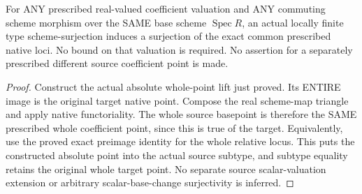 \begin{theorem}
\label{scheme:relative-native-locally-finite-type-surjective}
For ANY prescribed real-valued coefficient valuation and ANY commuting scheme
morphism over the SAME base scheme $\operatorname{Spec}R$, an actual locally finite
type scheme-surjection induces a surjection of the exact common prescribed native
loci. No bound on that valuation is required. No assertion for a separately
prescribed different source coefficient point is made.
\leanok
\end{theorem}
\begin{proof}
Construct the actual absolute whole-point lift just proved. Its ENTIRE image is
the original target native point. Compose the real scheme-map triangle and apply
native functoriality. The whole source basepoint is therefore the SAME prescribed
whole coefficient point, since this is true of the target. Equivalently, use the
proved exact preimage identity for the whole relative locus. This puts the
constructed absolute point into the actual source subtype, and subtype equality
retains the original whole target point. No separate source scalar-valuation
extension or arbitrary scalar-base-change surjectivity is inferred.
\end{proof}
